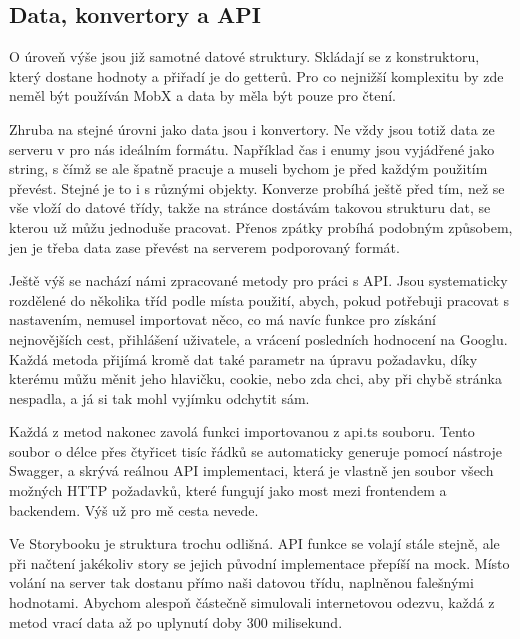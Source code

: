\subsection{Data, konvertory a API}
O úroveň výše jsou již samotné datové struktury. Skládají se z konstruktoru, který dostane hodnoty a přiřadí je do getterů. Pro co nejnižší komplexitu by zde neměl být používán MobX a data by měla být pouze pro čtení.

Zhruba na stejné úrovni jako data jsou i konvertory. Ne vždy jsou totiž data ze serveru v pro nás ideálním formátu. Například čas i enumy jsou vyjádřené jako string, s čímž se ale špatně pracuje a museli bychom je před každým použitím převést. Stejné je to i s různými objekty. Konverze probíhá ještě před tím, než se vše vloží do datové třídy, takže na stránce dostávám takovou strukturu dat, se kterou už můžu jednoduše pracovat. Přenos zpátky probíhá podobným způsobem, jen je třeba data zase převést na serverem podporovaný formát.

Ještě výš se nachází námi zpracované metody pro práci s API. Jsou systematicky rozdělené do několika tříd podle místa použití, abych, pokud potřebuji pracovat s nastavením, nemusel importovat něco, co má navíc funkce pro získání nejnovějších cest, přihlášení uživatele, a vrácení posledních hodnocení na Googlu. Každá metoda přijímá kromě dat také parametr na úpravu požadavku, díky kterému můžu měnit jeho hlavičku, cookie, nebo zda chci, aby při chybě stránka nespadla, a já si tak mohl vyjímku odchytit sám.

Každá z metod nakonec zavolá funkci importovanou z api.ts souboru. Tento soubor o délce přes čtyřicet tisíc řádků se automaticky generuje pomocí nástroje Swagger, a skrývá reálnou API implementaci, která je vlastně jen soubor všech možných HTTP požadavků, které fungují jako most mezi frontendem a backendem. Výš už pro mě cesta nevede.

Ve Storybooku je struktura trochu odlišná. API funkce se volají stále stejně, ale při načtení jakékoliv story se jejich původní implementace přepíší na mock. 
Místo volání na server tak dostanu přímo naši datovou třídu, naplněnou falešnými hodnotami. Abychom alespoň částečně simulovali internetovou odezvu, každá z metod vrací data až po uplynutí doby 300 milisekund.
